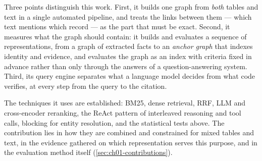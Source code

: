 Three points distinguish this work. First, it builds one graph from \emph{both} tables and text in a single
automated pipeline, and treats the links between them --- which text mentions which record --- as the part that
must be exact. Second, it measures what the graph should contain: it builds and evaluates a sequence of
representations, from a graph of extracted facts to an \emph{anchor graph} that indexes identity and evidence,
and evaluates the graph as an index with criteria fixed in advance rather than only through the answers of a
question-answering system. Third, its query engine separates what a language model decides from what code
verifies, at every step from the query to the citation.

The techniques it uses are established: BM25, dense retrieval, RRF, LLM and cross-encoder reranking, the ReAct
pattern of interleaved reasoning and tool calls, blocking for entity resolution, and the statistical tests
above. The contribution lies in how they are combined and constrained for mixed tables and text, in the
evidence gathered on which representation serves this purpose, and in the evaluation method itself
(\cref{sec:ch01-contributions}).
